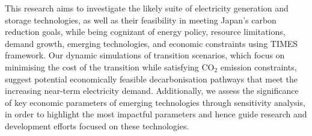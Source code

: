 This research aims to investigate the likely suite of electricity generation and storage technologies, as well as their feasibility in meeting Japan's carbon reduction goals, while being cognizant of energy policy, resource limitations, demand growth, emerging technologies, and economic constraints using \gls{TIMES} framework. Our dynamic simulations of transition scenarios, which focus on minimising the cost of the transition while satisfying CO$_2$ emission constraints, suggest potential economically feasible decarbonisation pathways that meet the increasing near-term electricity demand. Additionally, we assess the significance of key economic parameters of emerging technologies through sensitivity analysis, in order to highlight the most impactful parameters and hence guide research and development efforts focused on these technologies.
